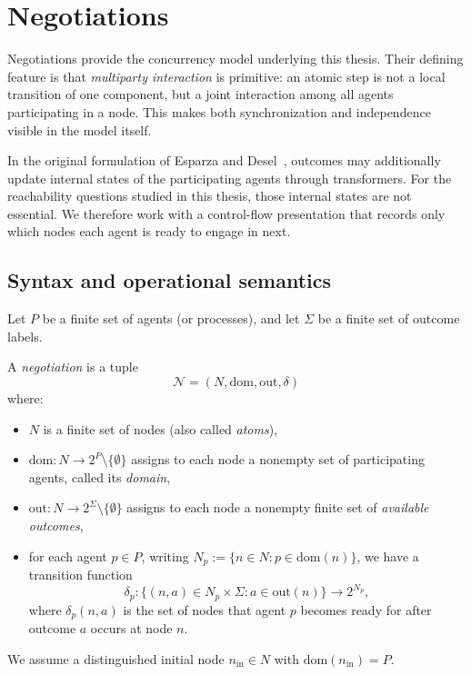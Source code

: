 
\section{Negotiations}
\label{sec:prelim-negotiations}

Negotiations provide the concurrency model underlying this thesis. Their defining feature is that \emph{multiparty interaction} is primitive: an atomic step is not a local transition of one component, but a joint interaction among all agents participating in a node. This makes both synchronization and independence visible in the model itself.

In the original formulation of Esparza and Desel~\cite{EsparzaDeselNegotiations}, outcomes may additionally update internal states of the participating agents through transformers. For the reachability questions studied in this thesis, those internal states are not essential. We therefore work with a control-flow presentation that records only which nodes each agent is ready to engage in next.

\subsection{Syntax and operational semantics}
\label{subsec:prelim-neg-syntax}

Let $P$ be a finite set of agents (or processes), and let $\Sigma$ be a finite set of outcome labels.

\begin{definition}[Negotiation]
\label{def:prelim-negotiation}
A \emph{negotiation} is a tuple
\[
\mathcal{N}=(N,\mathrm{dom},\mathrm{out},\delta)
\]
where:
\begin{itemize}
    \item $N$ is a finite set of nodes (also called \emph{atoms}),
    \item $\mathrm{dom} : N \to 2^P \setminus \{\emptyset\}$ assigns to each node a nonempty set of participating agents, called its \emph{domain},
    \item $\mathrm{out} : N \to 2^{\Sigma} \setminus \{\emptyset\}$ assigns to each node a nonempty finite set of \emph{available outcomes},
    \item for each agent $p \in P$, writing $N_p := \{n \in N : p \in \mathrm{dom}(n)\}$, we have a transition function
    \[
    \delta_p : \{(n,a) \in N_p \times \Sigma : a \in \mathrm{out}(n)\} \to 2^{N_p},
    \]
    where $\delta_p(n,a)$ is the set of nodes that agent $p$ becomes ready for after outcome $a$ occurs at node $n$.
\end{itemize}
We assume a distinguished initial node $n_{\mathrm{in}} \in N$ with $\mathrm{dom}(n_{\mathrm{in}})=P$.
\end{definition}

